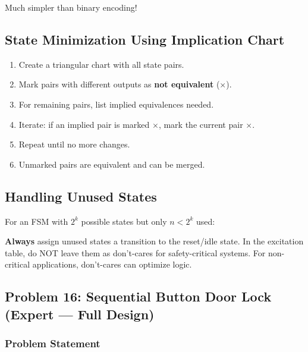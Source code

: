\documentclass[12pt,a4paper]{article}
\begin{document}
Much simpler than binary encoding!

\subsection{State Minimization Using Implication Chart}

\begin{enumerate}
  \item Create a triangular chart with all state pairs.
  \item Mark pairs with different outputs as \textbf{not equivalent} ($\times$).
  \item For remaining pairs, list implied equivalences needed.
  \item Iterate: if an implied pair is marked $\times$, mark the current pair $\times$.
  \item Repeat until no more changes.
  \item Unmarked pairs are equivalent and can be merged.
\end{enumerate}

\subsection{Handling Unused States}

For an FSM with $2^k$ possible states but only $n < 2^k$ used:

\begin{importantbox}
\textbf{Always} assign unused states a transition to the reset/idle state. In the excitation table, do NOT leave them as don't-cares for safety-critical systems. For non-critical applications, don't-cares can optimize logic.
\end{importantbox}


\subsection{Problem 16: Sequential Button Door Lock (Expert --- Full Design)}
\label{sec:problem16}

\subsubsection{Problem Statement}
\end{document}
